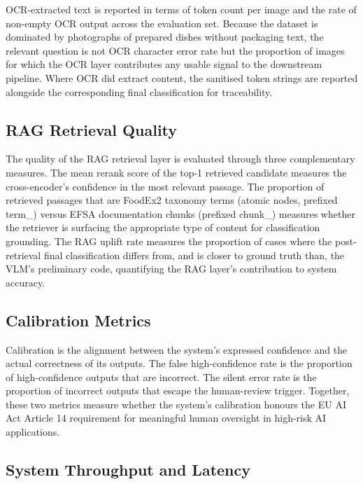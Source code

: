 OCR-extracted text is reported in terms of token count per image and the rate of non-empty OCR output across the evaluation set. Because the dataset is dominated by photographs of prepared dishes without packaging text, the relevant question is not OCR character error rate but the proportion of images for which the OCR layer contributes any usable signal to the downstream pipeline. Where OCR did extract content, the sanitised token strings are reported alongside the corresponding final classification for traceability.

\hypertarget{rag-retrieval-quality}{%
\subsection{RAG Retrieval Quality}\label{rag-retrieval-quality}}

The quality of the RAG retrieval layer is evaluated through three complementary measures. The mean rerank score of the top-1 retrieved candidate measures the cross-encoder's confidence in the most relevant passage. The proportion of retrieved passages that are FoodEx2 taxonomy terms (atomic nodes, prefixed term\_) versus EFSA documentation chunks (prefixed chunk\_) measures whether the retriever is surfacing the appropriate type of content for classification grounding. The RAG uplift rate measures the proportion of cases where the post-retrieval final classification differs from, and is closer to ground truth than, the VLM's preliminary code, quantifying the RAG layer's contribution to system accuracy.

\hypertarget{calibration-metrics}{%
\subsection{Calibration Metrics}\label{calibration-metrics}}

Calibration is the alignment between the system's expressed confidence and the actual correctness of its outputs. The false high-confidence rate is the proportion of high-confidence outputs that are incorrect. The silent error rate is the proportion of incorrect outputs that escape the human-review trigger. Together, these two metrics measure whether the system's calibration honours the EU AI Act Article 14 requirement for meaningful human oversight in high-risk AI applications.

\hypertarget{system-throughput-and-latency}{%
\subsection{System Throughput and Latency}\label{system-throughput-and-latency}}

